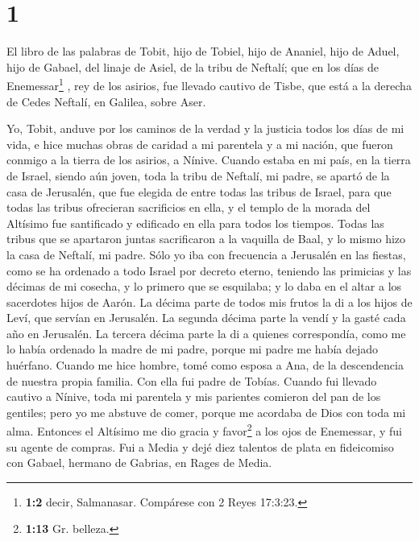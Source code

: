 \hypertarget{section}{%
\section{1}\label{section}}

 El libro de las palabras de Tobit, hijo de Tobiel, hijo
de Ananiel, hijo de Aduel, hijo de Gabael, del linaje de Asiel, de la
tribu de Neftalí;  que en los días de Enemessar\footnote{\textbf{1:2}
  decir, Salmanasar. Compárese con 2 Reyes 17:3:23.} , rey de los
asirios, fue llevado cautivo de Tisbe, que está a la derecha de Cedes
Neftalí, en Galilea, sobre Aser.

 Yo, Tobit, anduve por los caminos de la verdad y la
justicia todos los días de mi vida, e hice muchas obras de caridad a mi
parentela y a mi nación, que fueron conmigo a la tierra de los asirios,
a Nínive.  Cuando estaba en mi país, en la tierra de
Israel, siendo aún joven, toda la tribu de Neftalí, mi padre, se apartó
de la casa de Jerusalén, que fue elegida de entre todas las tribus de
Israel, para que todas las tribus ofrecieran sacrificios en ella, y el
templo de la morada del Altísimo fue santificado y edificado en ella
para todos los tiempos.  Todas las tribus que se apartaron
juntas sacrificaron a la vaquilla de Baal, y lo mismo hizo la casa de
Neftalí, mi padre.  Sólo yo iba con frecuencia a Jerusalén
en las fiestas, como se ha ordenado a todo Israel por decreto eterno,
teniendo las primicias y las décimas de mi cosecha, y lo primero que se
esquilaba; y lo daba en el altar a los sacerdotes hijos de Aarón.
 La décima parte de todos mis frutos la di a los hijos de
Leví, que servían en Jerusalén. La segunda décima parte la vendí y la
gasté cada año en Jerusalén.  La tercera décima parte la
di a quienes correspondía, como me lo había ordenado la madre de mi
padre, porque mi padre me había dejado huérfano.  Cuando
me hice hombre, tomé como esposa a Ana, de la descendencia de nuestra
propia familia. Con ella fui padre de Tobías.  Cuando fui
llevado cautivo a Nínive, toda mi parentela y mis parientes comieron del
pan de los gentiles;  pero yo me abstuve de comer,
 porque me acordaba de Dios con toda mi alma.
 Entonces el Altísimo me dio gracia y favor\footnote{\textbf{1:13}
  Gr. belleza.} a los ojos de Enemessar, y fui su agente de compras.
 Fui a Media y dejé diez talentos de plata en fideicomiso
con Gabael, hermano de Gabrias, en Rages de Media.

